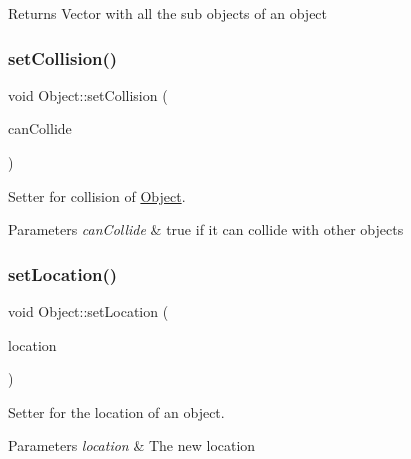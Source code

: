\begin{DoxyReturn}{Returns}
Vector with all the sub objects of an object 
\end{DoxyReturn}
\mbox{\label{classObject_a641a0ab489382ba76bd4c538733cc2a4}} 
\subsubsection{\texorpdfstring{set\+Collision()}{setCollision()}}
{\footnotesize\ttfamily void Object\+::set\+Collision (\begin{DoxyParamCaption}\item[{bool}]{can\+Collide }\end{DoxyParamCaption})}



Setter for collision of \hyperlink{classObject}{Object}. 


\begin{DoxyParams}{Parameters}
{\em can\+Collide} & true if it can collide with other objects \\
\hline
\end{DoxyParams}
\mbox{\label{classObject_a00673d96b2a75c67f9744f9fc1689727}} 
\subsubsection{\texorpdfstring{set\+Location()}{setLocation()}}
{\footnotesize\ttfamily void Object\+::set\+Location (\begin{DoxyParamCaption}\item[{const game\+Location \&}]{location }\end{DoxyParamCaption})}



Setter for the location of an object. 


\begin{DoxyParams}{Parameters}
{\em location} & The new location \\
\hline
\end{DoxyParams}
\mbox{\label{classObject_a0676101219bc31debb04d9d46f64ee15}} 
